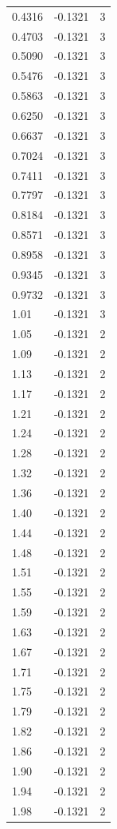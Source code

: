 \begin{longtable}{lrr}
  0.4316 & -0.1321 & 3 \\
  0.4703 & -0.1321 & 3 \\
  0.5090 & -0.1321 & 3 \\
  0.5476 & -0.1321 & 3 \\
  0.5863 & -0.1321 & 3 \\
  0.6250 & -0.1321 & 3 \\
  0.6637 & -0.1321 & 3 \\
  0.7024 & -0.1321 & 3 \\
  0.7411 & -0.1321 & 3 \\
  0.7797 & -0.1321 & 3 \\
  0.8184 & -0.1321 & 3 \\
  0.8571 & -0.1321 & 3 \\
  0.8958 & -0.1321 & 3 \\
  0.9345 & -0.1321 & 3 \\
  0.9732 & -0.1321 & 3 \\
  1.01 & -0.1321 & 3 \\
  1.05 & -0.1321 & 2 \\
  1.09 & -0.1321 & 2 \\
  1.13 & -0.1321 & 2 \\
  1.17 & -0.1321 & 2 \\
  1.21 & -0.1321 & 2 \\
  1.24 & -0.1321 & 2 \\
  1.28 & -0.1321 & 2 \\
  1.32 & -0.1321 & 2 \\
  1.36 & -0.1321 & 2 \\
  1.40 & -0.1321 & 2 \\
  1.44 & -0.1321 & 2 \\
  1.48 & -0.1321 & 2 \\
  1.51 & -0.1321 & 2 \\
  1.55 & -0.1321 & 2 \\
  1.59 & -0.1321 & 2 \\
  1.63 & -0.1321 & 2 \\
  1.67 & -0.1321 & 2 \\
  1.71 & -0.1321 & 2 \\
  1.75 & -0.1321 & 2 \\
  1.79 & -0.1321 & 2 \\
  1.82 & -0.1321 & 2 \\
  1.86 & -0.1321 & 2 \\
  1.90 & -0.1321 & 2 \\
  1.94 & -0.1321 & 2 \\
  1.98 & -0.1321 & 2 \\

\end{longtable}
